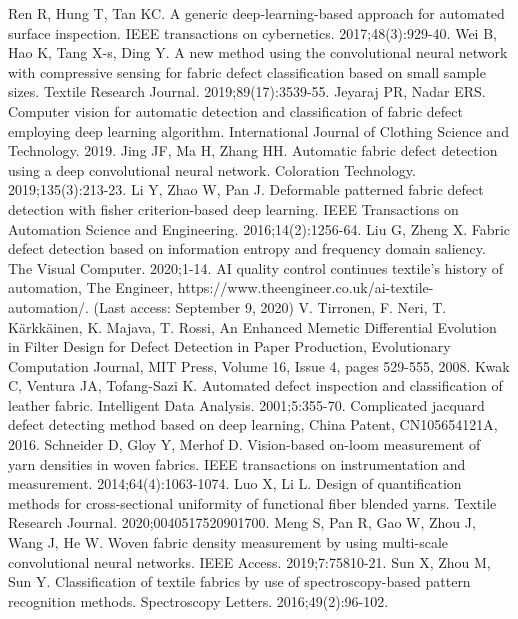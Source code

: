 \begin{thebibliography}{99}
Ren R, Hung T, Tan KC. A generic deep-learning-based approach for automated surface inspection. IEEE transactions on cybernetics. 2017;48(3):929-40. 
Wei B, Hao K, Tang X-s, Ding Y. A new method using the convolutional neural network with compressive sensing for fabric defect classification based on small sample sizes. Textile Research Journal. 2019;89(17):3539-55. 
Jeyaraj PR, Nadar ERS. Computer vision for automatic detection and classification of fabric defect employing deep learning algorithm. International Journal of Clothing Science and Technology. 2019.
Jing JF, Ma H, Zhang HH. Automatic fabric defect detection using a deep convolutional neural network. Coloration Technology. 2019;135(3):213-23.
Li Y, Zhao W, Pan J. Deformable patterned fabric defect detection with fisher criterion-based deep learning. IEEE Transactions on Automation Science and Engineering. 2016;14(2):1256-64. 
 Liu G, Zheng X. Fabric defect detection based on information entropy and frequency domain saliency. The Visual Computer. 2020;1-14.
AI quality control continues textile's history of automation, The Engineer, https://www.theengineer.co.uk/ai-textile-automation/. (Last access: September 9, 2020) 
V. Tirronen, F. Neri, T. K\"{a}rkk\"{a}inen, K. Majava, T. Rossi, An Enhanced Memetic Differential Evolution in Filter Design for Defect Detection in Paper Production, Evolutionary Computation Journal, MIT Press, Volume 16, Issue 4, pages 529-555, 2008. 
Kwak C, Ventura JA, Tofang-Sazi K. Automated defect inspection and classification of leather fabric. Intelligent Data Analysis. 2001;5:355-70. 
Complicated jacquard defect detecting method based on deep learning, China Patent, CN105654121A, 2016.
Schneider D, Gloy Y, Merhof D. Vision-based on-loom measurement of yarn densities in woven fabrics. IEEE transactions on instrumentation and measurement. 2014;64(4):1063-1074. 
Luo X, Li L. Design of quantification methods for cross-sectional uniformity of functional fiber blended yarns. Textile Research Journal. 2020;0040517520901700.
Meng S, Pan R, Gao W, Zhou J, Wang J, He W. Woven fabric density measurement by using multi-scale convolutional neural networks. IEEE Access. 2019;7:75810-21. 
Sun X, Zhou M, Sun Y. Classification of textile fabrics by use of spectroscopy-based pattern recognition methods. Spectroscopy Letters. 2016;49(2):96-102. 

\end{thebibliography}
